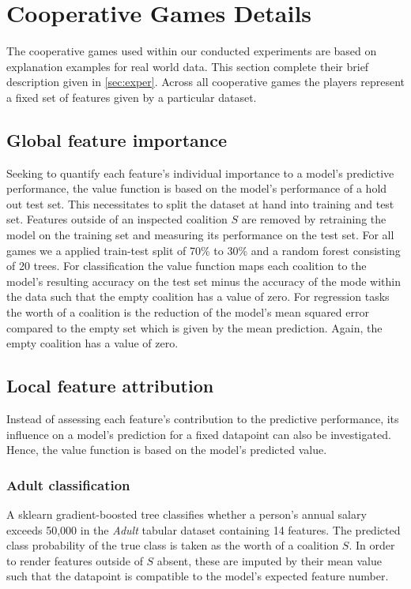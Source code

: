 \section{Cooperative Games Details} \label{app:cooperative_games}

The cooperative games used within our conducted experiments are based on explanation examples for real world data.
This section complete their brief description given in \cref{sec:exper}.
Across all cooperative games the players represent a fixed set of features given by a particular dataset.

\subsection{Global feature importance}

Seeking to quantify each feature's individual importance to a model's predictive performance, the value function is based on the model's performance of a hold out test set.
This necessitates to split the dataset at hand into training and test set.
Features outside of an inspected coalition $S$ are removed by retraining the model on the training set and measuring its performance on the test set.
For all games we a applied train-test split of 70\% to 30\% and a random forest consisting of 20 trees.
For classification the value function maps each coalition to the model's resulting accuracy on the test set minus the accuracy of the mode within the data such that the empty coalition has a value of zero.
For regression tasks the worth of a coalition is the reduction of the model's mean squared error compared to the empty set which is given by the mean prediction.
Again, the empty coalition has a value of zero.

\subsection{Local feature attribution}

Instead of assessing each feature's contribution to the predictive performance, its influence on a model's prediction for a fixed datapoint can also be investigated.
Hence, the value function is based on the model's predicted value.

\subsubsection{Adult classification}
A sklearn gradient-boosted tree classifies whether a person's annual salary exceeds 50,000 in the \emph{Adult} tabular dataset containing 14 features.
The predicted class probability of the true class is taken as the worth of a coalition $S$.
In order to render features outside of $S$ absent, these are imputed by their mean value such that the datapoint is compatible to the model's expected feature number.

